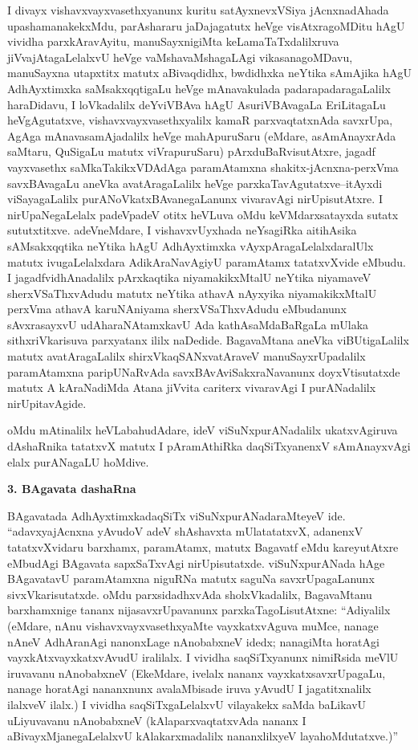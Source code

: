 I divayx vishavxvayxvasethxyanunx kuritu satAyxnevxVSiya jAcnxnadAhada upashamanakekxMdu, parAshararu jaDajagatutx heVge visAtxragoMDitu hAgU vividha parxkAravAyitu, manuSayx\-nigiMta keLamaTaTxdalilxruva jiVvajAtagaLelalxvU heVge vaMshavaMshagaLAgi vikasana\-goMDavu, manuSayxna utapxtitx matutx aBivaqdidhx, bwdidhxka neYtika sAmAjika hAgU AdhAyxtimxka saMsakxqqti\-gaLu heVge mAnavakulada padarapadaragaLalilx haraDidavu, I loVkadalilx deYviVBAva hAgU AsuriVBAvagaLa EriLitagaLu heVgAgutatxve, vishavxvayxvasethxyalilx kamaR parxvaqtatx\-nAda savxrUpa, AgAga mAnavasamAjadalilx heVge mahApuruSaru (eMdare, asAmAnayxrAda saMtaru, QuSigaLu matutx viVrapuruSaru) pArxduBaRvisutAtxre, jagadf vayxvasethx saMkaTakikxVDAdAga paramAtamxna shakitx-jAcnxna-perxVma savxBAvagaLu aneVka avatAragaLalilx heVge parxkaTavAgutatxve--itAyxdi viSayagaLalilx purANoVkatxBAvanegaLanunx vivaravAgi nirUpisutAtxre. I nirUpaNegaLelalx padeVpadeV otitx heVLuva oMdu keVMdarxsatayxda sutatx sututxtitxve. adeVneMdare, I vishavxvUyxhada neYsagiRka aitihAsika sAMsakxqqtika neYtika hAgU AdhAyxtimxka vAyxpAragaLelalxdaralUlx matutx ivugaLelalxdara AdikAraNavAgiyU paramAtamx tatatxvXvide eMbudu. I jagadfvidhAnadalilx pArxkaqtika niyamakikxMtalU neYtika niyamaveV sherxVSaThxvAdudu matutx neYtika athavA nAyxyika niyamakikxMtalU perxVma athavA karuNAniyama sherxVSaThxvAdudu eMbudanunx sAvxrasayxvU udAharaNAtamxkavU Ada kathAsaMdaBaRgaLa mUlaka sithxriVkarisuva parxyatanx ililx naDedide. BagavaMtana aneVka viBUtigaLalilx matutx avatAragaLalilx shirxVkaqSANxvatAraveV manuSayxrUpadalilx paramAtamxna paripUNaRvAda savxBAvAviSakxraNavanunx doyxVtisutatxde matutx A kAraNadiMda Atana jiVvita cariterx vivaravAgi I purANadalilx nirUpitavAgide.

oMdu mAtinalilx heVLabahudAdare, ideV viSuNxpurANadalilx ukatxvAgiruva dAshaRnika tatatxvX matutx I pAramAthiRka daqSiTxyanenxV sAmAnayxvAgi elalx purANagaLU hoMdive.

\smallskip
\begin{center}
{\Large\bf 3. BAgavata dashaRna}
\end{center}

BAgavatada AdhAyxtimxkadaqSiTx viSuNxpurANadaraMteyeV ide. ``adavxyajAcnxna \hbox{yAvudoV} adeV shAshavxta mUlatatatxvX, adanenxV tatatxvXvidaru barxhamx, paramAtamx, matutx Bagavatf eMdu kareyutAtxre eMbudAgi BAgavata sapxSaTxvAgi nirUpisutatxde. viSuNx\-purANada hAge BAgavatavU paramAtamxna niguRNa matutx saguNa savxrUpagaLanunx sivxVkari\-sutatxde. oMdu parxsidadhxvAda sholxVkadalilx, BagavaMtanu barxhamxnige tananx nijasavxrUpavanunx parxkaTa\-goLisutAtxne: ``Adiyalilx (eMdare, nAnu vishavxvayxvasethxyaMte vayxkatxvAguva muMce, nanage nAneV AdhAranAgi nanonxLage nAnobabxneV idedx; nanagiMta horatAgi vayxkAtxvayxkatx\-vAvudU iralilalx. I vividha saqSiTxyanunx nimiRsida meVlU iruvavanu nAnobabxneV (EkeMdare, ivelalx nananx vayxkatxsavxrUpagaLu, nanage horatAgi nananxnunx avalaMbisade iruva yAvudU I jagatitxnalilx ilalxveV ilalx.) I vividha saqSiTxgaLelalxvU vilayakekx saMda baLikavU uLiyuvavanu nAnobabxneV (kAlaparxvaqtatxvAda nananx I aBivayxMjanegaLelalxvU kAlakarxmadalilx nananxlilxyeV layahoMdutatxve.)''

